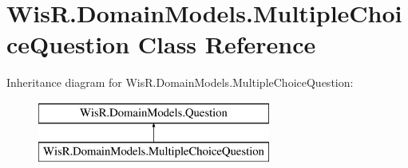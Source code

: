 \hypertarget{class_wis_r_1_1_domain_models_1_1_multiple_choice_question}{}\section{Wis\+R.\+Domain\+Models.\+Multiple\+Choice\+Question Class Reference}
\label{class_wis_r_1_1_domain_models_1_1_multiple_choice_question}
Inheritance diagram for Wis\+R.\+Domain\+Models.\+Multiple\+Choice\+Question\+:\begin{figure}[H]
\begin{center}
\leavevmode
\includegraphics[height=2.000000cm]{class_wis_r_1_1_domain_models_1_1_multiple_choice_question}
\end{center}
\end{figure}
